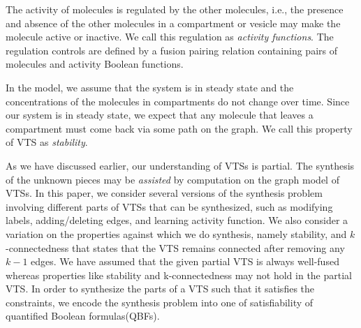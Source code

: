 %
The activity of molecules is regulated by the other molecules, i.e.,
the presence and absence of the other molecules in a compartment or
vesicle may make the molecule active or inactive.
%
We call this regulation as {\em activity functions}.
%
%
%
%
The regulation controls are defined by a fusion pairing relation
containing pairs of molecules and activity
Boolean functions.

%
In the model, we assume that the system is in steady state and the
concentrations of the molecules in compartments do not change over
time.
%
Since our system is in steady state, we expect that any molecule that
leaves a compartment must come back via some path on the graph.
%
We call this property of VTS as {\em stability}.

%
As we have discussed earlier, our understanding of VTSs is partial.
%
%
%
%
The synthesis of the unknown pieces may be {\em assisted} by computation on
the graph model of VTSs.
%
In this paper, we consider several versions of the synthesis problem
involving different parts of VTSs that can be synthesized, such as
modifying labels, adding/deleting edges, and learning activity function.
%
We also consider a variation on the properties against which we do
synthesis, namely stability, and $k$-connectedness that states that the VTS remains connected after removing any $k-1$ edges.
%
We have assumed that the given partial VTS is always well-fused whereas properties like stability and k-connectedness may not hold in the partial VTS.
%
In order to synthesize the parts of a VTS such that it satisfies the
constraints, we encode the synthesis problem into one of satisfiability of
quantified Boolean formulas(QBFs). 
%

